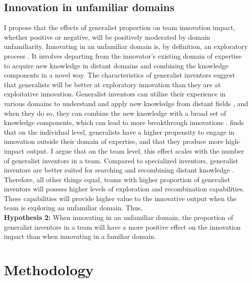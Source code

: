 \documentclass{article}
\begin{document}
\subsection{Innovation in unfamiliar domains}
I propose that the effects of generalist proportion on team innovation impact, whether positive or negative, will be positively moderated by domain unfamiliarity. Innovating in an unfamiliar domain is, by definition, an exploratory process \autocite{March1991}. It involves departing from the innovator's existing domain of expertise to acquire new knowledge in distant domains and combining the knowledge components in a novel way.
The characteristics of generalist inventors suggest that generalists will be better at exploratory innovation than they are at exploitative innovation. Generalist inventors can utilize their experience in various domains to understand and apply new knowledge from distant fields \autocite{Nagle2020}, and when they do so, they can combine the new knowledge with a broad set of knowledge components, which can lead to more breakthrough innovations \autocite{Huo2019,Ahuja2001,Kaplan2015,Fleming2001,Uzzi2013}.
\textcite{Nagle2020} finds that on the individual level, generalists have a higher propensity to engage in innovation outside their domain of expertise, and that they produce more high-impact output. I argue that on the team level, this effect scales with the number of generalist inventors in a team. Compared to specialized inventors, generalist inventors are better suited for searching and recombining distant knowledge \autocite{Nagle2020,Toh2014}. Therefore, all other things equal, teams with higher proportion of generalist inventors will possess higher levels of exploration and recombination capabilities. These capabilities will provide higher value to the innovative output when the team is exploring an unfamiliar domain.
Thus,\\
\textbf{Hypothesis 2:} When innovating in an unfamiliar domain, the proportion of generalist inventors in a team will have a more positive effect on the innovation impact than when innovating in a familiar domain.

\section{Methodology}
\end{document}
